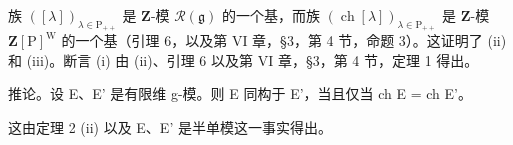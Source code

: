 族 \(([\lambda])_{\lambda \in \mathrm{P}_{++}}\) 是 \(\mathbf{Z}\)-模 \(\mathcal{R}(\mathfrak{g})\) 的一个基，而族 \((\operatorname{ch}[\lambda])_{\lambda \in \mathrm{P}_{++}}\) 是 \(\mathbf{Z}\)-模 \(\mathbf{Z}[\mathrm{P}]^{\mathrm{W}}\) 的一个基（引理 6，以及第 VI 章，§3，第 4 节，命题 3）。这证明了 (ii) 和 (iii)。断言 (i) 由 (ii)、引理 6 以及第 VI 章，§3，第 4 节，定理 1 得出。

推论。设 E、E' 是有限维 g-模。则 E 同构于 E'，当且仅当 ch E = ch E'。

这由定理 2 (ii) 以及 E、E' 是半单模这一事实得出。

